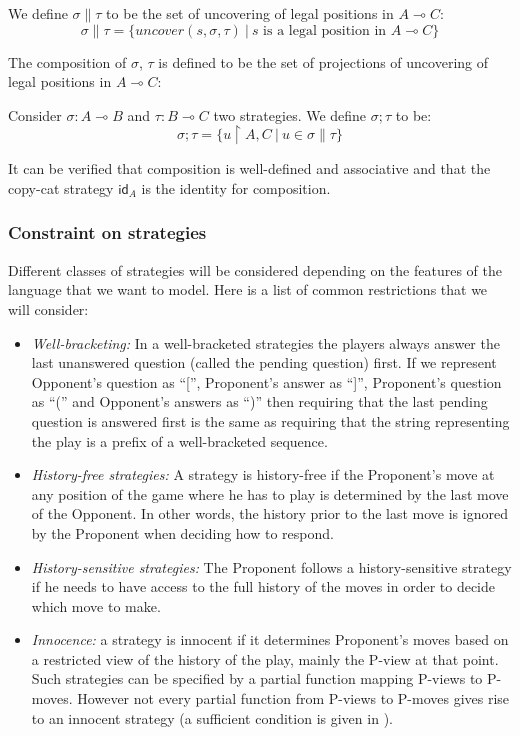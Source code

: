 We define $\sigma \| \tau $ to be the set of uncovering of legal
positions in $A \multimap C$:
$$ \sigma \| \tau = \{ uncover(s, \sigma, \tau) \ | \ s \mbox{ is a legal position in } A \multimap C \}$$

The composition of $\sigma$, $\tau$ is defined to be the set of
projections of uncovering of legal positions in $A \multimap C$:

\begin{dfn}
Consider $\sigma : A \multimap B$ and  $\tau : B \multimap C$ two
strategies. We define $\sigma ; \tau$ to be:
$$ \sigma ; \tau = \{ u \upharpoonright A,C \ | \ u \in \sigma \|
\tau \}$$
\end{dfn}

It can be verified that composition is well-defined and associative
\citep{hylandong_pcf} and that the copy-cat strategy $\textsf{id}_A$ is the identity for composition.

\subsubsection{Constraint on strategies}

Different classes of strategies will be considered depending on the
features of the language that we want to model. Here is a list of
common restrictions that we will consider:
\begin{itemize}
\item \emph{Well-bracketing:} In a well-bracketed strategies the players always answer the last unanswered question (called the pending question) first.
If we represent Opponent's question as ``['', Proponent's answer as
``]'', Proponent's question as ``('' and Opponent's answers as ``)''
then requiring that the last pending question is answered first is
the same as requiring that the string representing the play is a
prefix of a well-bracketed sequence.

\item \emph{History-free strategies:} A strategy is history-free if the Proponent's move at any position of the game where he has to play
is determined by the last move of the Opponent. In other words, the
history prior to the last move is ignored by the Proponent when
deciding how to respond.

\item \emph{History-sensitive strategies:} The Proponent follows a history-sensitive strategy if he needs to have access to the full
history of the moves in order to decide which move to make.

\item \emph{Innocence:} a strategy is innocent if it determines Proponent's moves based on a restricted view of the history of the play, mainly the P-view
at that point. Such strategies can be specified by a partial
function mapping P-views to P-moves. However not every partial
function from P-views to P-moves gives rise to an innocent strategy
(a sufficient condition is given in \cite{hylandong_pcf}).
\end{itemize}

